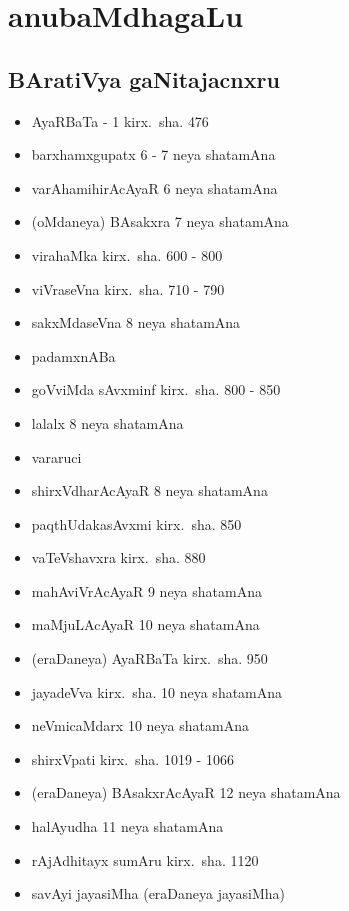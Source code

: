 \chapter{anubaMdhagaLu} 

\section*{BAratiVya gaNitajacnxru}

{\renewcommand\labelitemi{}
\begin{itemize}
\item AyaRBaTa - {\rm 1} kirx.~sha. {\rm 476}
\item barxhamxgupatx {\rm 6 - 7} neya shatamAna
\item varAhamihirAcAyaR {\rm 6} neya shatamAna
\item (oMdaneya) BAsakxra {\rm 7} neya shatamAna
\item virahaMka kirx.~sha. {\rm 600 - 800}
\item viVraseVna kirx.~sha. {\rm 710 - 790}
\item sakxMdaseVna {\rm 8} neya shatamAna
\item padamxnABa
\item goVviMda sAvxminf kirx.~sha. {\rm 800 - 850}
\item lalalx {\rm 8} neya shatamAna
\item vararuci
\item shirxVdharAcAyaR {\rm 8} neya shatamAna
\item paqthUdakasAvxmi kirx.~sha. {\rm 850}
\item vaTeVshavxra kirx.~sha. {\rm 880}
\item mahAviVrAcAyaR {\rm 9} neya shatamAna
\item maMjuLAcAyaR {\rm 10} neya shatamAna
\item (eraDaneya) AyaRBaTa kirx.~sha. {\rm 950}
\item  jayadeVva kirx.~sha. {\rm 10} neya shatamAna
\item neVmicaMdarx {\rm 10} neya shatamAna
\item shirxVpati kirx.~sha. {\rm 1019 - 1066}
\item (eraDaneya) BAsakxrAcAyaR {\rm 12} neya shatamAna
\item halAyudha {\rm 11} neya shatamAna
\item rAjAdhitayx sumAru kirx.~sha. {\rm 1120}
\item savAyi jayasiMha (eraDaneya jayasiMha)

\end{itemize}}
